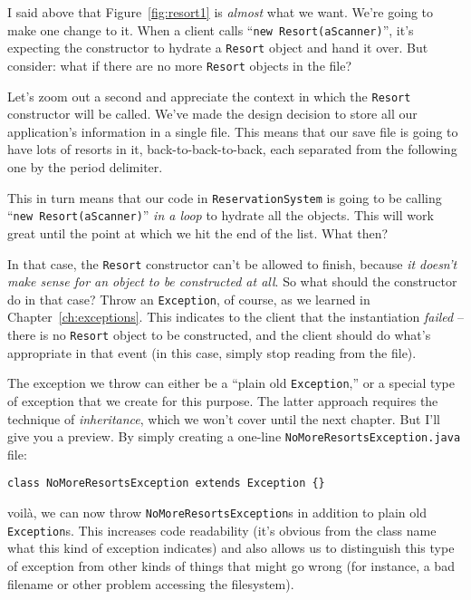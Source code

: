 I said above that Figure~\ref{fig:resort1} is \textit{almost} what we want.
We're going to make one change to it. When a client calls ``\texttt{new
Resort(aScanner)}'', it's expecting the constructor to hydrate a
\texttt{Resort} object and hand it over. But consider: what if there are no
more \texttt{Resort} objects in the file?

Let's zoom out a second and appreciate the context in which the
\texttt{Resort} constructor will be called. We've made the design decision to
store all our application's information in a single file. This means that our
save file is going to have lots of resorts in it, back-to-back-to-back, each
separated from the following one by the period delimiter.

This in turn means that our code in \texttt{ReservationSystem} is going to be
calling ``\texttt{new Resort(aScanner)}'' \textit{in a loop} to hydrate all
the objects. This will work great until the point at which we hit the end of
the list. What then?

In that case, the \texttt{Resort} constructor can't be allowed to finish,
because \textit{it doesn't make sense for an object to be constructed at all}.
So what should the constructor do in that case? Throw an \texttt{Exception},
of course, as we learned in Chapter~\ref{ch:exceptions}. This indicates to the
client that the instantiation \textit{failed} -- there is no \texttt{Resort}
object to be constructed, and the client should do what's appropriate in that
event (in this case, simply stop reading from the file).

The exception we throw can either be a ``plain old \texttt{Exception},'' or a
special type of exception that we create for this purpose. The latter approach
requires the technique of \textit{inheritance}, which we won't cover until the
next chapter. But I'll give you a preview. By simply creating a one-line
\texttt{NoMoreResortsException.java} file:

\begin{Verbatim}[fontsize=\small,samepage=true,frame=single]
class NoMoreResortsException extends Exception {}
\end{Verbatim}

voil\`{a}, we can now throw \texttt{NoMoreResortsException}s in addition to
plain old \texttt{Exception}s. This increases code readability (it's obvious
from the class name what this kind of exception indicates) and also allows us
to distinguish this type of exception from other kinds of things that might go
wrong (for instance, a bad filename or other problem accessing the
filesystem).

